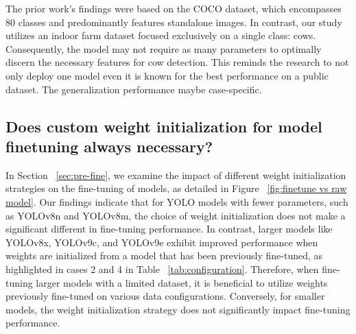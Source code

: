 The prior work's findings were based on the COCO dataset, which encompasses 80 classes and predominantly features standalone images. In contrast, our study utilizes an indoor farm dataset focused exclusively on a single class: cows. Consequently, the model may not require as many parameters to optimally discern the necessary features for cow detection. This reminds the research to not only deploy one model even it is known for the best performance on a public dataset. The generalization performance maybe case-specific.










\subsection{Does custom weight initialization for model finetuning always necessary?}



In Section ~\ref{sec:pre-fine}, we examine the impact of different weight initialization strategies on the fine-tuning of models, as detailed in Figure ~\ref{fig:finetune vs raw model}. Our findings indicate that for YOLO models with fewer parameters, such as YOLOv8n and YOLOv8m, the choice of weight initialization does not make a significant different in fine-tuning performance. In contrast, larger models like YOLOv8x, YOLOv9c, and YOLOv9e exhibit improved performance when weights are initialized from a model that has been previously fine-tuned, as highlighted in cases 2 and 4 in Table ~\ref{tab:configuration}. Therefore, when fine-tuning larger models with a limited dataset, it is beneficial to utilize weights previously fine-tuned on various data configurations. Conversely, for smaller models, the weight initialization strategy does not significantly impact fine-tuning performance.



